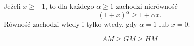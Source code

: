 \begin{theorem}
    \label{t:Bernoulli's inequality}
    Jeżeli $x \geq -1$, to dla każdego $\alpha \geq 1$ zachodzi nierówność
    \[ (1 + x)^\alpha \geq 1 + \alpha x. \]
    Równość zachodzi wtedy i tylko wtedy, gdy $\alpha = 1$ lub $x = 0$.
\end{theorem}

\begin{theorem}
    \label{t:mean ineqality}
    \[ AM \geq GM \geq HM \]
\end{theorem}